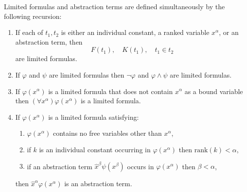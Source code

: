 Limited formulas and abstraction terms are defined simultaneously by the following recursion:
\begin{enumerate}
\item If each of $t_1, t_2$ is either an individual constant, a ranked variable $x^\alpha$, or an abstraction term, then
$$F(t_1), \quad K(t_1), \quad t_1 \in t_2$$
are limited formulas.
\item If $\varphi$ and $\psi$ are limited formulas then $\neg \varphi$ and $\varphi \wedge \psi$ are limited formulas.
\item If $\varphi(x^\alpha)$ is a limited formula that does not contain $x^\alpha$ as a bound variable then $(\forall x^\alpha)\varphi(x^\alpha)$ is a limited formula.
\item If $\varphi(x^\alpha)$ is a limited formula satisfying:
  \begin{enumerate}
  \item $\varphi(x^\alpha)$ contains no free variables other than $x^\alpha$,
  \item if $k$ is an individual constant occurring in $\varphi(x^\alpha)$ then $\text{rank}(k) < \alpha$,
  \item if an abstraction term $\hat{x}^\beta \psi(x^\beta)$ occurs in $\varphi(x^\alpha)$ then $\beta < \alpha$,
  \end{enumerate}
then $\hat{x}^\alpha \varphi(x^\alpha)$ is an abstraction term.
\end{enumerate}
